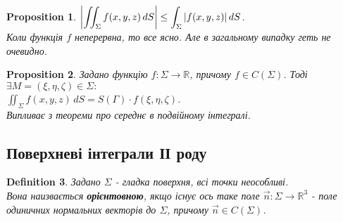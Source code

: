 \documentclass[a4paper, 10pt]{article}
\theoremstyle{theoremdd}
\newtheorem{theorem}{Theorem}[subsection]
\theoremstyle{theoremdd}
\newtheorem{definition}[theorem]{Definition}
\theoremstyle{theoremdd}
\theoremstyle{theoremdd}
\theoremstyle{theoremdd}
\newtheorem{proposition}[theorem]{Proposition}
\theoremstyle{theoremdd}
\theoremstyle{theoremdd}
\theoremstyle{theoremdd}
\newtheorem{corollary}[theorem]{Corollary}
\begin{document}
\begin{proposition}
$\displaystyle \abs{\iint_\Sigma f(x,y,z)\,dS} \leq \int_\Sigma |f(x,y,z)|\,dS$.\\
\textit{Коли функція $f$ неперервна, то все ясно. Але в загальному випадку геть не очевидно.}
\end{proposition}

\begin{proposition}
Задано функцію $f: \Sigma \to \mathbb{R}$, причому $f \in C(\Sigma)$. Тоді $\exists M = (\xi,\eta,\zeta) \in \Sigma:$\\
$\displaystyle\iint_\Sigma f(x,y,z)\,dS = S(\Gamma) \cdot f(\xi,\eta,\zeta)$.\\
\textit{Випливає з теореми про середнє в подвійному інтегралі.}
\end{proposition}

\iffalse
\begin{theorem}
Маємо $\vec{r_1},\vec{r_2}$ на відповідно $D_1, D_2$ (дві замкнені області) - дві параметризації однієї й той самої поверхні. Тоді\\
$\displaystyle\iint_{\Sigma_1} f(x,y,z)\,dS = \iint_{\Sigma_2} f(x,y,z)\,dS$.\\
Тобто поверхневий інтеграл І роду не залежить від параметризації та орієнтації. (про орієнтацію поверхні буде згодом)
\end{theorem}

Дійсно, неважливо, $\Gamma_1 = \Gamma_2$ чи $\Gamma_1 = -\Gamma_2$, ми отримаємо одну й ту саму криву $\Gamma$. У всіх випадках будуть одне й те саме розбиття $\tau_\Gamma$, обрані точки $N$. Тож від цього криволінійний інтеграл І роду не має залежність.


\begin{corollary}
Маємо криві $\Gamma_1, \Gamma_2$ під умовами теореми вище. Тоді $L(\Gamma_1) = L(\Gamma_2)$.
\end{corollary}
\fi

\subsection{Поверхневі інтеграли ІІ роду}
\begin{definition}
Задано $\Sigma$ - гладка поверхня, всі точки неособливі.\\
Вона наизвається \textbf{орієнтовною}, якщо існує ось таке поле $\vec{n}: \Sigma \to \mathbb{R}^3$ - поле одиничних нормальних векторів до $\Sigma$, причому $\vec{n} \in C(\Sigma)$.
\end{definition}
\end{document}
